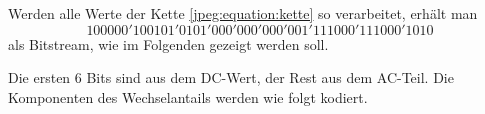 \begin{beispiel}
Werden alle Werte der Kette \eqref{jpeg:equation:kette} so verarbeitet,
erhält man
\begin{equation}
    100000'100101'0101'000'000'000'001'111000'111000'1010
    \label{jpeg:equation:bitstream}    
\end{equation}
als Bitstream, wie im Folgenden gezeigt werden soll.

Die ersten 6 Bits sind aus dem DC-Wert, der Rest aus dem AC-Teil.
Die Komponenten des Wechselantails werden wie folgt kodiert.




\end{beispiel}
